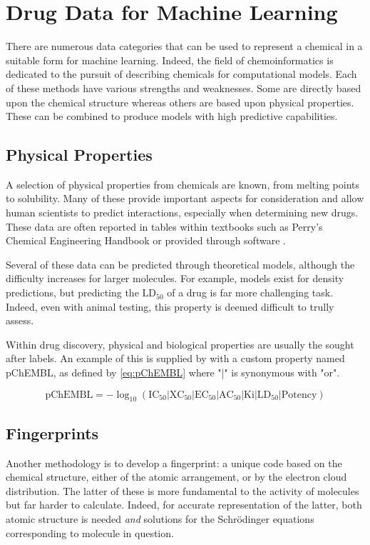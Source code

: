 \section{Drug Data for Machine Learning}
There are numerous data categories that can be used to represent a chemical in a suitable form for machine learning. Indeed, the field of chemoinformatics is dedicated to the pursuit of describing chemicals for computational models. Each of these methods have various strengths and weaknesses. Some are directly based upon the chemical structure whereas others are based upon physical properties. These can be combined to produce models with high predictive capabilities.

\subsection{Physical Properties}
A selection of physical properties from chemicals are known, from melting points to solubility. Many of these provide important aspects for consideration and allow human scientists to predict interactions, especially when determining new drugs. These data are often reported in tables within textbooks such as Perry's Chemical Engineering Handbook or provided through software \cite{CHEMBL,Perrys}.

Several of these data can be predicted through theoretical models, although the difficulty increases for larger molecules. For example, models exist for density predictions, but predicting the $\mathrm{LD_{50}}$ of a drug is  far more challenging task. Indeed, even with animal testing, this property is deemed difficult to trully assess.

Within drug discovery, physical and biological properties are usually the sought after labels. An example of this is supplied by \textcite{CHEMBL} with a custom property named pChEMBL, as defined by \ref{eq:pChEMBL} where  "|" is synonymous with "or".

\begin{equation}
  \label{eq:pChEMBL}
  \mathrm{pChEMBL}=-\log_{10}{\left(\mathrm{IC_{50}}|\mathrm{XC_{50}}|\mathrm{EC_{50}}|\mathrm{AC_{50}}|\mathrm{Ki}|\mathrm{LD_{50}}|\mathrm{Potency}\right)}
\end{equation}

\subsection{Fingerprints}
Another methodology is to develop a fingerprint: a unique code based on the chemical structure, either of the atomic arrangement, or by the electron cloud distribution. The latter of these is more fundamental to the activity of molecules but far harder to calculate. Indeed, for accurate representation of the latter, both atomic structure is needed \textit{and} solutions for the Schrödinger equations corresponding to molecule in question.

